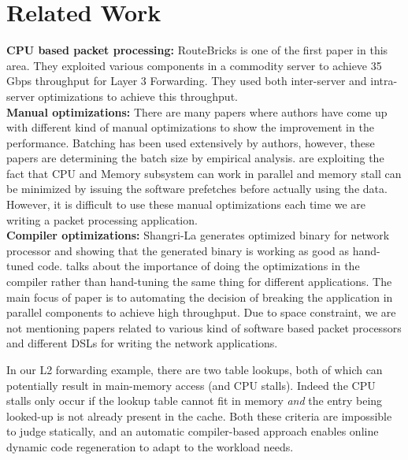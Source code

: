 \section{Related Work}
\label{relatedwork}
\textbf{CPU based packet processing:} RouteBricks\cite{dobrescu2009routebricks} is one of the first paper in this area. They exploited various components in a commodity server to achieve 35 Gbps throughput for Layer 3 Forwarding. They used both inter-server and intra-server optimizations to achieve this throughput.
\\
\textbf{Manual optimizations:} There are many papers where authors have come up with different kind of manual optimizations to show the improvement in the performance. Batching\cite{dobrescu2009routebricks, 189006, Kim:2012:PBC:2349896.2349910, Zhou:2013:SHP:2535372.2535379} has been used extensively by authors, however, these papers are determining the batch size by empirical analysis. \cite{189006, Zhou:2013:SHP:2535372.2535379} are exploiting the fact that CPU and Memory subsystem can work in parallel and memory stall can be minimized by issuing the software prefetches before actually using the data. However, it is difficult to use these manual optimizations each time we are writing a packet processing application.
\\
\textbf{Compiler optimizations:} Shangri-La \cite{Chen:2005:SAH:1065010.1065038} generates optimized binary for network processor and showing that the generated binary is working as good as hand-tuned code. \cite{Dobrescu:2010:CPM:1921151.1921154} talks about the importance of doing the optimizations in the compiler rather than hand-tuning the same thing for different applications. The main focus of paper \cite{Dobrescu:2010:CPM:1921151.1921154} is to automating the decision of breaking the application in parallel components to achieve high throughput.
Due to space constraint, we are not mentioning papers related to various kind of software based packet processors and different DSLs for writing the network applications.

In our L2 forwarding example, there are two table lookups, both of which can potentially result
in main-memory access (and CPU stalls). Indeed the CPU stalls only occur if the lookup table
cannot fit in memory {\em and} the entry being looked-up is not already present in the cache.
Both these criteria are impossible to judge statically, and an automatic compiler-based
approach enables online dynamic code regeneration to adapt to the workload needs.



